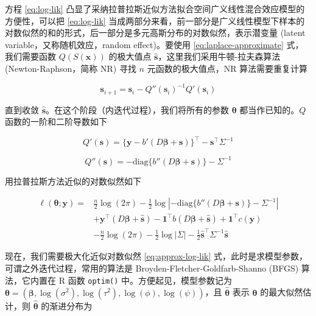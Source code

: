 \documentclass[12pt,a4paper,UTF8,twoside]{book}
\theoremstyle{definition}
\theoremstyle{definition}
\theoremstyle{definition}
\theoremstyle{remark}
\begin{document}
方程 \eqref{eq:log-lik}
凸显了采纳拉普拉斯近似方法拟合空间广义线性混合效应模型的方便性，可以把
\eqref{eq:log-lik}
当成两部分来看，前一部分是广义线性模型下样本的对数似然的和的形式，后一部分是多元高斯分布的对数似然，表示潜变量
(latent variable，又称随机效应，random effect)。要使用
\eqref{eq:laplace-approximate} 式，我们需要函数 \(Q(S(\mathbf{x}))\)
的极大值点 \(\hat{\mathbf{s}}\)，这里我们采用牛顿-拉夫森算法
(Newton-Raphson，简称 NR) 寻找 \(n\) 元函数的极大值点，NR
算法需要重复计算

\begin{equation}
\mathbf{s}_{i+1} = \mathbf{s}_{i} - Q''(\mathbf{s}_{i})^{-1}Q'(\mathbf{s}_{i}) 
\end{equation}

直到收敛
\(\hat{\mathbf{s}}\)。在这个阶段（内迭代过程），我们将所有的参数
\(\boldsymbol{\theta}\) 都当作已知的。\(Q\) 函数的一阶和二阶导数如下

\begin{equation}
Q'(\mathbf{s}) = \{\mathbf{y} - b'(D\boldsymbol{\beta} + \mathbf{s}) \}^{\top} - \mathbf{s}^{\top}\Sigma^{-1} \label{eq:first-deriv}
\end{equation}

\begin{equation}
Q''(\mathbf{s}) =  -\mathrm{diag} \{b''(D\boldsymbol{\beta} + \mathbf{s}) \} - \Sigma^{-1} \label{eq:second-deriv}
\end{equation}

用拉普拉斯方法近似的对数似然如下

\begin{equation}
\begin{aligned}
\ell(\boldsymbol{\theta};\mathbf{y}) = {} & \frac{n}{2}\log (2\pi) -\frac{1}{2}\log | -\mathrm{diag} \{b''(D\boldsymbol{\beta} + \mathbf{s}) \} - \Sigma^{-1} |  \\
& + \mathbf{y}^{\top} (D\boldsymbol{\beta} + \hat{\mathbf{s}}) - \mathbf{1}^{\top} b( D\boldsymbol{\beta} + \hat{\mathbf{s}}) + \mathbf{1}^{\top} c(\mathbf{y}) \\
& - \frac{n}{2}\log (2\pi) -\frac{1}{2}\log |\Sigma| -\frac{1}{2}\hat{\mathbf{s}}^{\top} \Sigma^{-1} \hat{\mathbf{s}}
\end{aligned} \label{eq:approx-log-lik}
\end{equation}

现在，我们需要极大化近似对数似然 \eqref{eq:approx-log-lik}
式，此时是求模型参数，可谓之外迭代过程，常用的算法是
Broyden-Fletcher-Goldfarb-Shanno (BFGS) 算法，它内置在 R 函数
\texttt{optim()} 中。方便起见，模型参数记为
\(\boldsymbol{\theta} = (\boldsymbol{\beta},\log(\sigma^2),\log(\tau^2),\log(\phi),\log(\psi))\)，且
\(\hat{\boldsymbol{\theta}}\) 表示 \(\boldsymbol{\theta}\)
的最大似然估计，则 \(\hat{\boldsymbol{\theta}}\) 的渐进分布为
\end{document}
